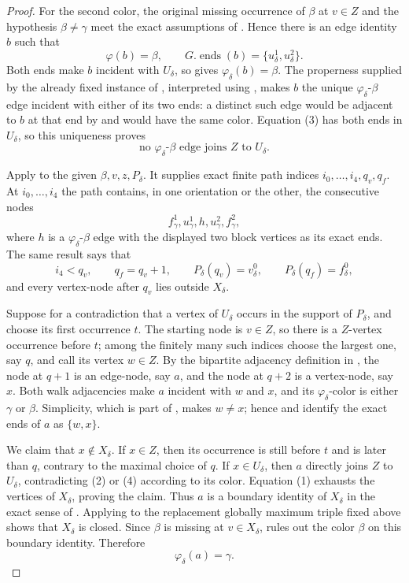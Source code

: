 \begin{proof}
For the second color, the original missing occurrence of $\beta$ at
$v\in Z$ and the hypothesis $\beta\ne\gamma$ meet the exact assumptions
of .  Hence there is an edge
identity $b$ such that
\[
       \varphi(b)=\beta,
       \qquad G.\operatorname{ends}(b)
                    =\{u^1_\delta,u^2_\delta\}.              \tag{3}
\]
Both ends make $b$ incident with $U_\delta$, so
 gives
$\varphi_\delta(b)=\beta$.  The properness supplied by the already fixed
instance of , interpreted using
, makes $b$ the unique
$\varphi_\delta$-$\beta$ edge incident with either of its two ends:
a distinct such edge would be adjacent to $b$ at that end by
 and would have the same color.  Equation (3) has
both ends in $U_\delta$, so this uniqueness proves
\[
 \text{no $\varphi_\delta$-$\beta$ edge joins $Z$ to $U_\delta$.} \tag{4}
\]

Apply  to the given
$\beta,v,z,P_\delta$.  It supplies exact finite path indices
$i_0,\ldots,i_4,q_v,q_f$.  At $i_0,\ldots,i_4$ the path contains, in one
orientation or the other, the consecutive nodes
\[
 f^1_\gamma,u^1_\gamma,h,u^2_\gamma,f^2_\gamma,             \tag{5}
\]
where $h$ is a $\varphi_\delta$-$\beta$ edge with the displayed two
block vertices as its exact ends.  The same result says that
\[
 i_4<q_v,\qquad q_f=q_v+1,\qquad
 P_\delta(q_v)=v^0_\delta,\qquad P_\delta(q_f)=f^0_\delta,       \tag{6}
\]
and every vertex-node after $q_v$ lies outside $X_\delta$.

Suppose for a contradiction that a vertex of $U_\delta$ occurs in the
support of $P_\delta$, and choose its first occurrence $t$.  The starting
node is $v\in Z$, so there is a $Z$-vertex occurrence before $t$; among
the finitely many such indices choose the largest one, say $q$, and call
its vertex $w\in Z$.  By the bipartite adjacency definition in
, the node at $q+1$ is an edge-node,
say $a$, and the node at $q+2$ is a vertex-node, say $x$.  Both walk
adjacencies make $a$ incident with $w$ and $x$, and its
$\varphi_\delta$-color is either $\gamma$ or $\beta$.  Simplicity, which
is part of , makes $w\ne x$; hence
 and  identify the exact
ends of $a$ as
$\{w,x\}$.

We claim that $x\notin X_\delta$.  If $x\in Z$, then its occurrence is
still before $t$ and is later than $q$, contrary to the maximal choice of
$q$.  If $x\in U_\delta$, then $a$ directly joins $Z$ to $U_\delta$,
contradicting (2) or (4) according to its color.  Equation (1) exhausts
the vertices of $X_\delta$, proving the claim.  Thus $a$ is a boundary
identity of $X_\delta$ in the exact sense of
.  Applying 
to the replacement globally maximum triple fixed above shows that
$X_\delta$ is closed.  Since $\beta$ is missing at $v\in X_\delta$,
 rules out the color $\beta$ on this
boundary identity.  Therefore
\[
                         \varphi_\delta(a)=\gamma.             \tag{7}
\]


\end{proof}
